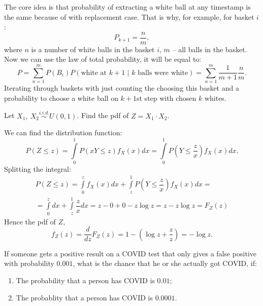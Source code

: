 \documentclass[12pt]{report}
\begin{document}
\begin{solution}
    The core idea is that probability of extracting a white ball at any timestamp is the same because of with replacement case. That is why, for example, for basket $i$:
    \[
        P_{k+1} = \dfrac{n}{m},  
    \]
    where $n$ is a number of white balls in the basket $i$, $m$ -- all balls in the basket. Now we can use the law of total probability, it will be equal to:
    \[
        P = \sum\limits_{n=1}^{m} P(B_i)P(\text{white at $k+1$ | $k$ balls were white}) = \sum\limits_{n=1}^{m} \dfrac{1}{m+1} \dfrac{n}{m}. 
    \] 
    Iterating through baskets with just counting the choosing this basket and a probability to choose a white ball on $k+1$st step with chosen $k$ whites.
\end{solution}

\begin{problem}{}
    Let $X_1,\ X_2 \overset{i.i.d.}{\sim} U(0, 1)$. Find the pdf of $Z = X_1 \cdot X_2$.
\end{problem}

\begin{solution}
    We can find the distribution function:
    \[
        P(Z \leq z) = \int\limits_0^1 P(xY \leq z)f_X(x)dx = \int\limits_0^1 P\left(Y \leq \dfrac{z}{x}\right)f_X(x)dx.  
    \]
    Splitting the integral:
    \[
        \begin{array}{c}            
        \displaystyle P(Z \leq z) = \int\limits_0^z f_X(x)dx + \int \limits_z^1 P\left(Y \leq \dfrac{z}{x}\right)f_X(x) dx = \\
        \displaystyle = \int\limits_0^z dx + \int\limits_z^1 \dfrac{z}{x}dx = z - 0 + 0 - z\log z = z - z\log z = F_Z(z)  
    \end{array}
    \]
    Hence the pdf of $Z$,
    \[
        f_Z(z) = \dfrac{d}{dz}F_Z(z) = 1 - \left(\log z + \dfrac{z}{z}\right) = -\log z.
    \]  
\end{solution}

\begin{problem}{}
    If someone gets a positive result on a COVID test that only gives a false positive with probability $0.001$, what is the chance that he or she actually got COVID, if:
    \begin{enumerate}
        \item The probability that a person has COVID is $0.01$;
        \item The probablity that a person has COVID is $0.0001$.
    \end{enumerate}
\end{problem}
\end{document}
